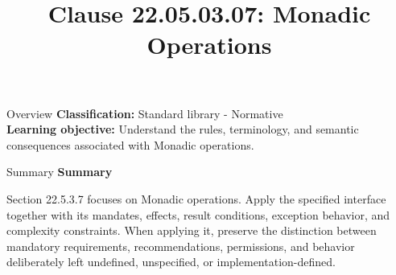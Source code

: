 \documentclass[10pt,letterpaper]{article}
\title{Clause 22.05.03.07: Monadic Operations}
\author{}
\date{}
\begin{document}
\maketitle
\begin{CornellOverviewBox}{Overview}
\textbf{Classification:} Standard library - Normative\\[2pt]
\textbf{Learning objective:} Understand the rules, terminology, and semantic consequences associated with Monadic operations.
\end{CornellOverviewBox}\begin{CornellSummaryBox}{Summary}
{\sffamily\bfseries\color{Accent} Summary}\par\vspace{3pt}Section 22.5.3.7 focuses on Monadic operations. Apply the specified interface together with its mandates, effects, result conditions, exception behavior, and complexity constraints. When applying it, preserve the distinction between mandatory requirements, recommendations, permissions, and behavior deliberately left undefined, unspecified, or implementation-defined.
\end{CornellSummaryBox}
\end{document}
